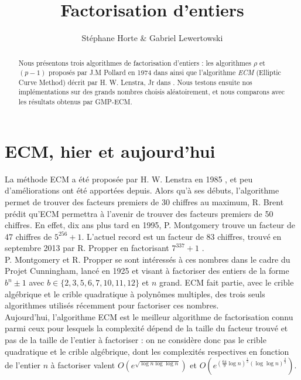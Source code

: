 \documentclass[11pt,a4paper]{article}
\title{Factorisation d'entiers}
\author{Stéphane Horte \& Gabriel Lewertowski}
\begin{document}
\maketitle

\tableofcontents

\begin{abstract}
Nous présentons trois algorithmes de factorisation d'entiers : les algorithmes \textit{$\rho$} et \textit{$(p-1)$} proposés par J.M Pollard en 1974 dans \cite{pollard_rho} ainsi que l'algorithme \textit{ECM} (Elliptic Curve Method) décrit par H. W. Lenstra, Jr dans \cite{lenstra}. Nous testons ensuite nos implémentations sur des grands nombres choisis aléatoirement, et nous comparons avec les résultats obtenus par GMP-ECM.
\end{abstract}

\section{ECM, hier et aujourd'hui}
La méthode ECM a été proposée par H. W. Lenstra en 1985 \cite{lenstra}, et peu d'améliorations ont été apportées depuis. Alors qu'à ses débuts, l'algorithme permet de trouver des facteurs premiers de 30 chiffres au maximum, R. Brent prédit qu'ECM permettra à l'avenir de trouver des facteurs premiers de 50 chiffres. En effet, dix ans plus tard en 1995, P. Montgomery trouve un facteur de 47 chiffres de $5^{256} +1$. L'actuel record est un facteur de 83 chiffres, trouvé en septembre 2013 par R. Propper en factorisant $7^{337}+1$ \cite{records_ecm}. \\

P. Montgomery et R. Propper se sont intéressés à ces nombres dans le cadre du Projet Cunningham, lancé en 1925 et visant à factoriser des entiers de la forme $b^n \pm 1$ avec $b \in \{2, 3, 5, 6, 7, 10, 11, 12\}$ et $n$ grand. ECM fait partie, avec le crible algébrique et le crible quadratique à polynômes multiples, des trois seuls algorithmes utilisés récemment pour factoriser ces nombres. \\

Aujourd'hui, l'algorithme ECM est le meilleur algorithme de factorisation connu parmi ceux pour lesquels la complexité dépend de la taille du facteur trouvé et pas de la taille de l'entier à factoriser : on ne considère donc pas le crible quadratique et le crible algébrique, dont les complexités respectives en fonction de l'entier $n$ à factoriser valent $O\left(e^{\sqrt{\log n\log\log n}}\right)$ et $O\left(e^{(\frac{64}{9}\log n)^{\frac{1}{3}}(\log\log n)^{\frac{2}{3}}}\right)$. \\
\end{document}
